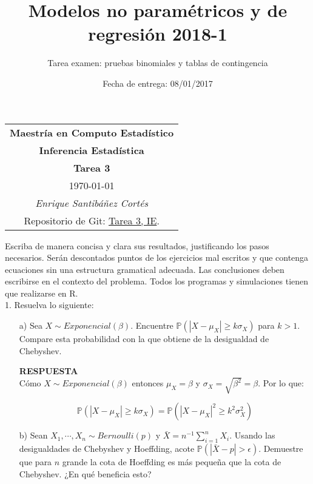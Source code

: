 \documentclass[11pt,letterpaper]{article}
\title{Modelos no paramétricos y de regresión 2018-1}
\author{Tarea examen: pruebas binomiales y tablas de contingencia}
\date{Fecha de entrega: 08/01/2017}
\newcommand{\mP}{\mathbb{P}}
\newcommand{\res}{\textbf{RESPUESTA}\\}
\begin{document}
\begin{table}[ht]
\centering
\begin{tabular}{c}
\textbf{Maestría en Computo Estadístico}\\
\textbf{Inferencia Estadística} \\
\textbf{Tarea 3}\\
\today \\
\emph{Enrique Santibáñez Cortés}\\
Repositorio de Git: \href{https://github.com/Enriquesec/Inferencia_Estad-stica/tree/master/Tareas/Tarea_3}{Tarea 3, IE}.
\end{tabular}
\end{table}
Escriba de manera concisa y clara sus resultados, justificando los pasos necesarios. Serán descontados puntos de los ejercicios mal escritos y que contenga ecuaciones sin una estructura gramatical adecuada. Las conclusiones deben escribirse en el contexto del problema. Todos los programas y
simulaciones tienen que realizarse en R.\\

1. Resuelva lo siguiente:

\begin{itemize}
\item[a)] Sea $X\sim Exponencial(\beta)$. Encuentre $\mP(|X-\mu_X |\geq k\sigma_X)$ para $k>1$. Compare esta probabilidad con la que obtiene de la desigualdad de Chebyshev. 

\res 
Cómo $X\sim Exponencial(\beta)$ entonces $\mu_X=\beta$ y $\sigma_X=\sqrt{\beta^2}=\beta.$ Por lo que:

$$\mP(|X-\mu_X |\geq k\sigma_X)=\mP(|X-\mu_X |^2\geq k^2\sigma_X^2)$$

\item[b)] Sean $X_1,\cdots,X_n\sim Bernoulli(p)$ y $\bar{X}=n^{-1}\sum_{i=1}^n X_i$. Usando las desigualdades de Chebyshev y Hoeffding, acote $\mP(|\bar{X}-p|>\epsilon)$. Demuestre que para $n$ grande la cota de Hoeffding es más pequeña que la cota de Chebyshev. ¿En qué beneficia esto?
\end{itemize}
\end{document}
